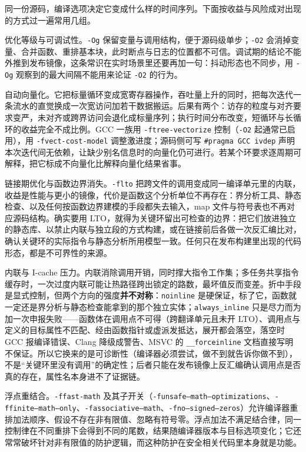 \documentclass[12pt,a4paper,fontset=fandol]{ctexbook}
\newcommand{\Tp}[1]{\texttt{#1}}
\newcommand{\Bk}{\discretionary{}{}{}}
\begin{document}
同一份源码，编译选项决定它变成什么样的时间序列。下面按收益与风险成对出现的方式过一遍常用几组。

优化等级与可调试性。\Tp{-Og} 保留变量与调用结构，便于源码级单步；\Tp{-O2} 会消掉变量、合并函数、重排基本块，此时断点与日志的位置都不可信。调试期的结论不能外推到发布镜像，这条常识在实时场景里还要再加一句：抖动形态也不同步，用 \Tp{-Og} 观察到的最大间隔不能用来论证 \Tp{-O2} 的行为。

自动向量化。它把标量循环变成宽寄存器操作，吞吐量上升的同时，把每次迭代一条流水的直觉换成一次宽访问加若干数据搬运。后果有两个：访存的粒度与对齐要求变严，未对齐或跨界访问会退化成标量序列；执行时间分布改变，短循环与长循环的收益完全不成比例。GCC 一族用 \Tp{-ftree-vectorize} 控制（\Tp{-O2} 起通常已启用），用 \Tp{-fvect-cost-model} 调整激进度；源码侧可写 \Tp{\#pragma GCC ivdep} 声明本次迭代间无依赖，让缺少别名信息时的向量化仍可进行。若某个环要求逐周期可解释，把它标成不向量化比解释向量化结果省事。

链接期优化与函数边界消失。\Tp{-flto} 把跨文件的调用变成同一编译单元里的内联，收益是性能与更小的镜像，代价是函数这个分析单位不再存在：界分析工具、静态检查、以及任何按函数边界建模的手段都失去输入，map 文件与符号表也不再对应源码结构。确实要用 LTO，就得为关键环留出可检查的边界：把它们放进独立的静态库、以禁止内联与独立段的方式构建，或在链接前后各做一次反汇编比对，确认关键环的实际指令与静态分析所用模型一致。任何只在发布构建里出现的代码形态，都是不可界性的来源。

内联与 I-cache 压力。内联消除调用开销，同时撑大指令工作集；多任务共享指令缓存时，一次过度内联可能让热路径跨出锁定的路数，最坏值反而变差。折中手段是显式控制，但两个方向的强度\textbf{并不对称}：\Tp{noinline} 是硬保证，标了它，函数就一定还是界分析与静态检查能拿到的那个独立实体；\Tp{always\_inline} 只是尽力而为加一次申报失败——函数体在调用点不可得（跨翻译单元且未开 LTO）、调用点与定义的目标属性不匹配、经由函数指针或虚派发抵达，展开都会落空，落空时 GCC 报编译错误、Clang 降级成警告、MSVC 的 \Tp{\_\_forceinline} 文档直接写明不保证。所以它换来的是可诊断性（编译器必须尝试，做不到就告诉你做不到），不是``关键环里没有调用''的确定性；后者只能在发布镜像上反汇编确认调用点是否真的存在，属性名本身进不了证据链。

浮点重结合。\Tp{-ffast-math} 及其子开关（\Tp{-funsafe--{\Bk}math--{\Bk}optimizations}、\Tp{-ffinite--{\Bk}math--{\Bk}only}、\Tp{-fassociative--{\Bk}math}、\Tp{-fno--{\Bk}signed--{\Bk}zeros}）允许编译器重排加法顺序、假设不存在非有限值、忽略有符号零。浮点加法不满足结合律，同一控制律在不同重排下会得到不同的尾数，结果随编译器版本与目标选项变化；它还常常破坏针对非有限值的防护逻辑，而这种防护在安全相关代码里本身就是功能。
\end{document}
